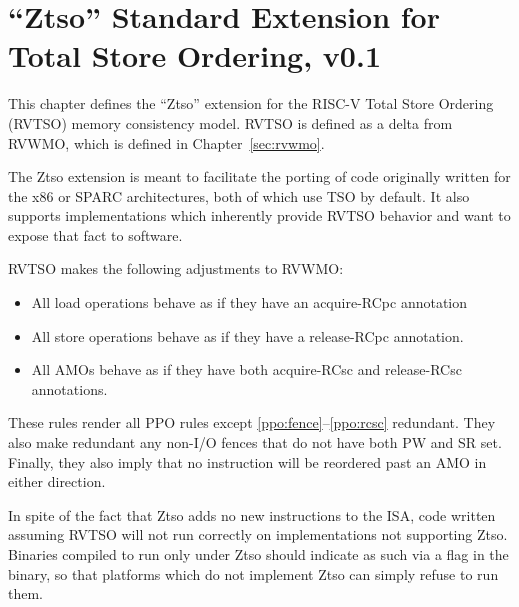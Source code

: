 \chapter{``Ztso'' Standard Extension for Total Store Ordering, v0.1}
\label{sec:ztso}

This chapter defines the ``Ztso'' extension for the RISC-V Total Store Ordering (RVTSO) memory consistency model.
RVTSO is defined as a delta from RVWMO, which is defined in Chapter~\ref{sec:rvwmo}.

\begin{commentary}
  The Ztso extension is meant to facilitate the porting of code originally written for the x86 or SPARC architectures, both of which use TSO by default.
  It also supports implementations which inherently provide RVTSO behavior and want to expose that fact to software.
\end{commentary}

RVTSO makes the following adjustments to RVWMO:

\begin{itemize}
  \item All load operations behave as if they have an acquire-RCpc annotation
  \item All store operations behave as if they have a release-RCpc annotation.
  \item All AMOs behave as if they have both acquire-RCsc and release-RCsc annotations.
\end{itemize}

\begin{commentary}
  These rules render all PPO rules except \ref{ppo:fence}--\ref{ppo:rcsc} redundant.
  They also make redundant any non-I/O fences that do not have both PW and SR set.
  Finally, they also imply that no instruction will be reordered past an AMO in either direction.
\end{commentary}

In spite of the fact that Ztso adds no new instructions to the ISA, code written assuming RVTSO will not run correctly on implementations not supporting Ztso.
Binaries compiled to run only under Ztso should indicate as such via a flag in the binary, so that platforms which do not implement Ztso can simply refuse to run them.
